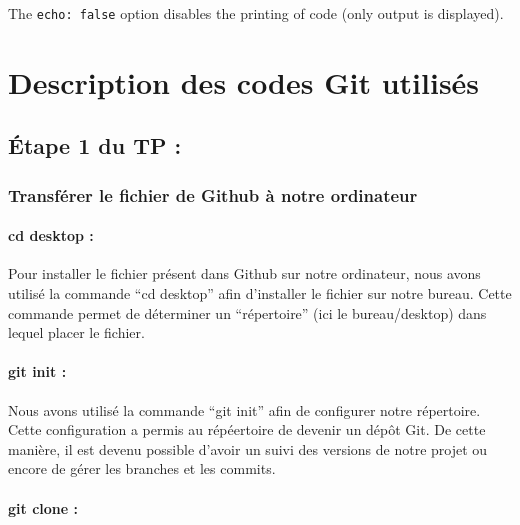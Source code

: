 \documentclass[
  letterpaper,
  DIV=11,
  numbers=noendperiod]{scrartcl}
\let\oldparagraph\paragraph
\renewcommand{\paragraph}[1]{\oldparagraph{#1}\mbox{}}
\begin{document}
The \texttt{echo:\ false} option disables the printing of code (only
output is displayed).

\hypertarget{description-des-codes-git-utilisuxe9s}{%
\section{Description des codes Git
utilisés}\label{description-des-codes-git-utilisuxe9s}}

\hypertarget{uxe9tape-1-du-tp}{%
\subsection{Étape 1 du TP :}\label{uxe9tape-1-du-tp}}

\hypertarget{transfuxe9rer-le-fichier-de-github-uxe0-notre-ordinateur}{%
\subsubsection{Transférer le fichier de Github à notre
ordinateur}\label{transfuxe9rer-le-fichier-de-github-uxe0-notre-ordinateur}}

\hypertarget{cd-desktop}{%
\paragraph{cd desktop :}\label{cd-desktop}}

Pour installer le fichier présent dans Github sur notre ordinateur, nous
avons utilisé la commande ``cd desktop'' afin d'installer le fichier sur
notre bureau. Cette commande permet de déterminer un ``répertoire'' (ici
le bureau/desktop) dans lequel placer le fichier.

\hypertarget{git-init}{%
\paragraph{git init :}\label{git-init}}

Nous avons utilisé la commande ``git init'' afin de configurer notre
répertoire. Cette configuration a permis au répéertoire de devenir un
dépôt Git. De cette manière, il est devenu possible d'avoir un suivi des
versions de notre projet ou encore de gérer les branches et les commits.

\hypertarget{git-clone}{%
\paragraph{git clone :}\label{git-clone}}
\end{document}
